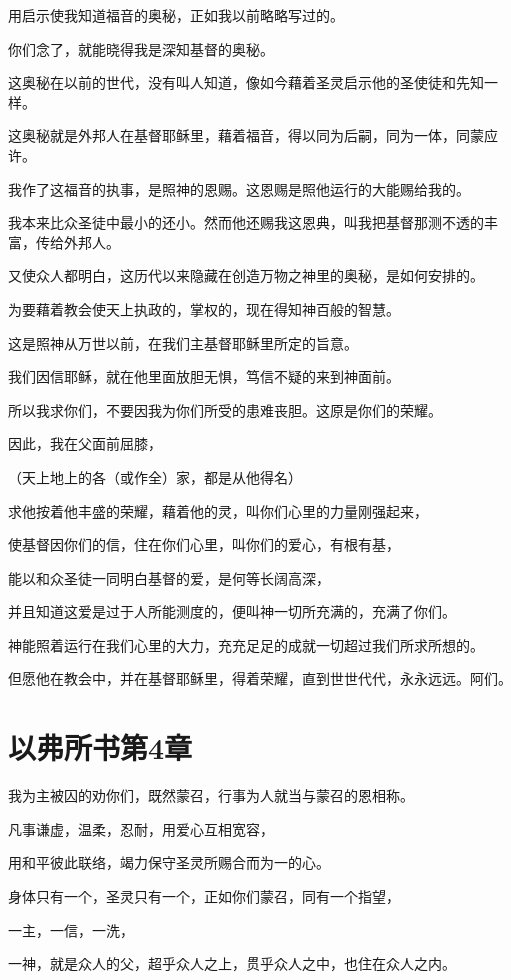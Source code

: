 \documentclass[12pt,oneside]{book}
\begin{document}
用启示使我知道福音的奥秘，正如我以前略略写过的。

你们念了，就能晓得我是深知基督的奥秘。

这奥秘在以前的世代，没有叫人知道，像如今藉着圣灵启示他的圣使徒和先知一样。

这奥秘就是外邦人在基督耶稣里，藉着福音，得以同为后嗣，同为一体，同蒙应许。

我作了这福音的执事，是照神的恩赐。这恩赐是照他运行的大能赐给我的。

我本来比众圣徒中最小的还小。然而他还赐我这恩典，叫我把基督那测不透的丰富，传给外邦人。

又使众人都明白，这历代以来隐藏在创造万物之神里的奥秘，是如何安排的。

为要藉着教会使天上执政的，掌权的，现在得知神百般的智慧。

这是照神从万世以前，在我们主基督耶稣里所定的旨意。

我们因信耶稣，就在他里面放胆无惧，笃信不疑的来到神面前。

所以我求你们，不要因我为你们所受的患难丧胆。这原是你们的荣耀。

因此，我在父面前屈膝，

（天上地上的各（或作全）家，都是从他得名）

求他按着他丰盛的荣耀，藉着他的灵，叫你们心里的力量刚强起来，

使基督因你们的信，住在你们心里，叫你们的爱心，有根有基，

能以和众圣徒一同明白基督的爱，是何等长阔高深，

并且知道这爱是过于人所能测度的，便叫神一切所充满的，充满了你们。

神能照着运行在我们心里的大力，充充足足的成就一切超过我们所求所想的。

但愿他在教会中，并在基督耶稣里，得着荣耀，直到世世代代，永永远远。阿们。

\chapter{以弗所书第4章}
我为主被囚的劝你们，既然蒙召，行事为人就当与蒙召的恩相称。

凡事谦虚，温柔，忍耐，用爱心互相宽容，

用和平彼此联络，竭力保守圣灵所赐合而为一的心。

身体只有一个，圣灵只有一个，正如你们蒙召，同有一个指望，

一主，一信，一洗，

一神，就是众人的父，超乎众人之上，贯乎众人之中，也住在众人之内。
\end{document}
